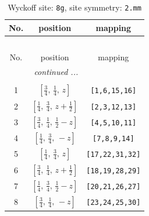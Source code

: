 \documentclass[fleqn,8pt]{jsarticle}
\begin{document}
\renewcommand{\arraystretch}{1.2}
\begin{longtable}{ccc}
\caption{Wyckoff site: {\tt 8g}, site symmetry: {\tt 2.mm}}
 \\
 \hline \hline
No. & position & mapping \\ \hline \endfirsthead

\multicolumn{2}{l}{\tablename\ \thetable{}} \\
 \hline \hline
No. & position & mapping \\ \hline \endhead

 \hline \hline
\multicolumn{2}{r}{\footnotesize\it continued ...} \\ \endfoot

 \hline \hline
\multicolumn{2}{r}{} \\ \endlastfoot

1 & $\left[ \frac{3}{4},\, \frac{1}{4},\, z \right]$ & {\tt [1,6,15,16]} \\ \hline
2 & $\left[ \frac{1}{4},\, \frac{3}{4},\, z + \frac{1}{2} \right]$ & {\tt [2,3,12,13]} \\ \hline
3 & $\left[ \frac{3}{4},\, \frac{1}{4},\, \frac{1}{2} - z \right]$ & {\tt [4,5,10,11]} \\ \hline
4 & $\left[ \frac{1}{4},\, \frac{3}{4},\, - z \right]$ & {\tt [7,8,9,14]} \\ \hline
5 & $\left[ \frac{1}{4},\, \frac{3}{4},\, z \right]$ & {\tt [17,22,31,32]} \\ \hline
6 & $\left[ \frac{3}{4},\, \frac{1}{4},\, z + \frac{1}{2} \right]$ & {\tt [18,19,28,29]} \\ \hline
7 & $\left[ \frac{1}{4},\, \frac{3}{4},\, \frac{1}{2} - z \right]$ & {\tt [20,21,26,27]} \\ \hline
8 & $\left[ \frac{3}{4},\, \frac{1}{4},\, - z \right]$ & {\tt [23,24,25,30]} \\
\end{longtable}
\renewcommand{\arraystretch}{1.2}
\end{document}

